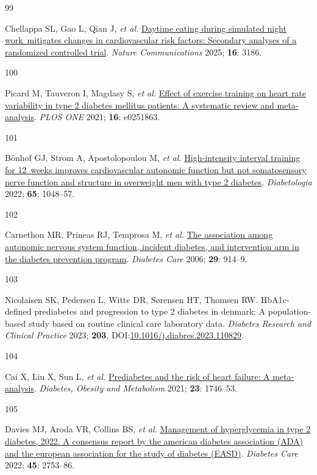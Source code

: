 \documentclass[
  a4paper,
  headsepline=true,
  open=any]{scrbook}
\newlength{\cslhangindent}
\newlength{\csllabelwidth}
\newlength{\cslentryspacingunit} %
\newenvironment{CSLReferences}[2] %
 {%
  \setlength{\parindent}{0pt}
  \ifodd #1
  \let\oldpar\par
  \def\par{\hangindent=\cslhangindent\oldpar}
  \fi
  \setlength{\parskip}{#2\cslentryspacingunit}
 }%
 {}
\newcommand{\CSLLeftMargin}[1]{\parbox[t]{\csllabelwidth}{#1}}
\newcommand{\CSLRightInline}[1]{\parbox[t]{\linewidth - \csllabelwidth}{#1}\break}
\begin{document}
\begin{CSLReferences}{0}{0}
\leavevmode{}%
\CSLLeftMargin{99 }%
\CSLRightInline{Chellappa SL, Gao L, Qian J, \emph{et al.}
\href{https://doi.org/10.1038/s41467-025-57846-y}{Daytime eating during
simulated night work~mitigates changes in cardiovascular risk factors:
Secondary analyses of a randomized controlled trial}. \emph{Nature
Communications} 2025; \textbf{16}: 3186.}

\leavevmode{}%
\CSLLeftMargin{100 }%
\CSLRightInline{Picard M, Tauveron I, Magdasy S, \emph{et al.}
\href{https://doi.org/10.1371/journal.pone.0251863}{Effect of exercise
training on heart rate variability in type 2 diabetes mellitus patients:
A systematic review and meta-analysis}. \emph{PLOS ONE} 2021;
\textbf{16}: e0251863.}

\leavevmode{}%
\CSLLeftMargin{101 }%
\CSLRightInline{Bönhof GJ, Strom A, Apostolopoulou M, \emph{et al.}
\href{https://doi.org/10.1007/s00125-022-05674-w}{High-intensity
interval training for 12~weeks improves cardiovascular autonomic
function but not somatosensory nerve function and structure in
overweight men with type 2 diabetes}. \emph{Diabetologia} 2022;
\textbf{65}: 1048--57.}

\leavevmode{}%
\CSLLeftMargin{102 }%
\CSLRightInline{Carnethon MR, Prineas RJ, Temprosa M, \emph{et al.}
\href{https://doi.org/10.2337/diacare.29.04.06.dc05-1729}{The
association among autonomic nervous system function, incident diabetes,
and intervention arm in the diabetes prevention program}. \emph{Diabetes
Care} 2006; \textbf{29}: 914--9.}

\leavevmode{}%
\CSLLeftMargin{103 }%
\CSLRightInline{Nicolaisen SK, Pedersen L, Witte DR, Sørensen HT,
Thomsen RW. HbA1c-defined prediabetes and progression to type 2 diabetes
in denmark: A population-based study based on routine clinical care
laboratory data. \emph{Diabetes Research and Clinical Practice} 2023;
\textbf{203}.
DOI:\href{https://doi.org/10.1016/j.diabres.2023.110829}{10.1016/j.diabres.2023.110829}.}

\leavevmode{}%
\CSLLeftMargin{104 }%
\CSLRightInline{Cai X, Liu X, Sun L, \emph{et al.}
\href{https://doi.org/10.1111/dom.14388}{Prediabetes and the risk of
heart failure: A meta-analysis}. \emph{Diabetes, Obesity and Metabolism}
2021; \textbf{23}: 1746--53.}

\leavevmode{}%
\CSLLeftMargin{105 }%
\CSLRightInline{Davies MJ, Aroda VR, Collins BS, \emph{et al.}
\href{https://doi.org/10.2337/dci22-0034}{Management of hyperglycemia in
type 2 diabetes, 2022. A consensus report by the american diabetes
association (ADA) and the european association for the study of diabetes
(EASD)}. \emph{Diabetes Care} 2022; \textbf{45}: 2753--86.}


\end{CSLReferences}
\end{document}
